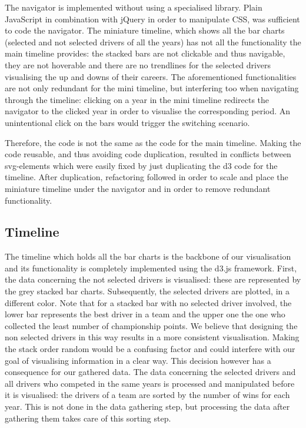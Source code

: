 \documentclass{sigchi}
\begin{document}
The navigator is implemented without using a specialised library. Plain JavaScript in combination with jQuery in order to manipulate CSS, was sufficient to code the navigator. The miniature timeline, which shows all the bar charts (selected and not selected drivers of all the years)  has not all the functionality the main timeline provides: the stacked bars are not clickable and thus navigable, they are not hoverable and there are no trendlines for the selected drivers visualising the up and downs of their careers. The aforementioned functionalities are not only redundant for the mini timeline, but interfering too when navigating  through the timeline: clicking on a year in the mini timeline redirects the navigator to the clicked year in order to visualise the corresponding period. An unintentional click on the bars would trigger the switching scenario. 

Therefore, the code is not the same as the code for the main timeline. Making the code reusable, and thus avoiding code duplication, resulted in conflicts between svg-elements which were easily fixed by just duplicating the d3 code for the timeline. After duplication, refactoring followed in order to scale and place the miniature timeline under the navigator and in order to remove redundant functionality. 


\subsection{Timeline} %
\label{sub:timeline}
The timeline which holds all the bar charts is the backbone of our visualisation and its functionality is completely implemented using the d3.js framework. First, the data concerning the not selected drivers is visualised: these are represented by the grey stacked bar charts. Subsequently, the selected drivers are plotted, in a different color. Note that for a stacked bar with no selected driver involved, the lower bar represents the best driver in a team and the upper one the one who collected the least number of championship points. We believe that designing the non selected drivers in this way results in a more consistent visualisation. Making the stack order random would be a confusing factor and could interfere with our goal of visualising information in a clear way. This decision however has a consequence for our gathered data. The data concerning the selected drivers and all drivers who competed in the same years is processed and manipulated before it is visualised: the drivers of a team are sorted by the number of wins for each year. This is not done in the data gathering step, but processing the data after gathering them takes care of this sorting step.
\end{document}
